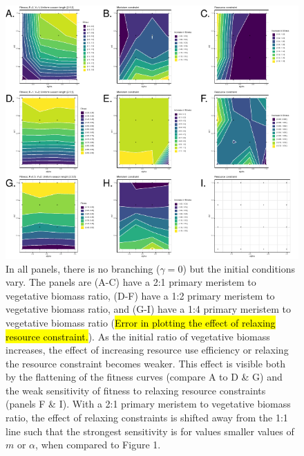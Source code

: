 \documentclass[12pt, oneside,a4paper]{article}   	%
\begin{document}
\begin{figure}[h]
	\includegraphics[page=1,width=\textwidth]{figure-2} %
        \caption{ In all panels, there is no branching ($\gamma=0$) but the initial conditions vary. The panels are (A-C) have a 2:1 primary meristem to vegetative biomass ratio, (D-F) have a 1:2 primary meristem to vegetative biomass ratio, and (G-I) have a 1:4 primary meristem to vegetative biomass ratio (\hl{Error in plotting the effect of relaxing resource constraint.}). As the initial ratio of vegetative biomass increases, the effect of increasing resource use efficiency or relaxing the resource constraint  becomes weaker. This effect is visible both by the flattening of the fitness curves (compare A to D \& G) and the weak sensitivity of fitness to relaxing resource constraints (panels F \& I). With a 2:1 primary meristem to vegetative biomass ratio, the effect of relaxing constraints is shifted away from the 1:1 line such that the strongest sensitivity is for values smaller values of $m$ or $\alpha$, when compared to Figure 1. }
        \label{fig:intro-figure}
\end{figure}
\end{document}
